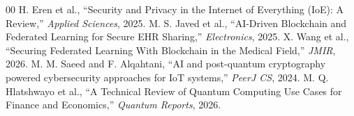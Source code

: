 \documentclass[journal, 10pt, twocolumn]{IEEEtran}
\begin{document}
\begin{thebibliography}{00}
 H. Eren et al., ``Security and Privacy in the Internet of Everything (IoE): A Review,'' \textit{Applied Sciences}, 2025.
 M. S. Javed et al., ``AI-Driven Blockchain and Federated Learning for Secure EHR Sharing,'' \textit{Electronics}, 2025.
 X. Wang et al., ``Securing Federated Learning With Blockchain in the Medical Field,'' \textit{JMIR}, 2026.
 M. M. Saeed and F. Alqahtani, ``AI and post-quantum cryptography powered cybersecurity approaches for IoT systems,'' \textit{PeerJ CS}, 2024.
 M. Q. Hlatshwayo et al., ``A Technical Review of Quantum Computing Use Cases for Finance and Economics,'' \textit{Quantum Reports}, 2026.
\end{thebibliography}
\end{document}
